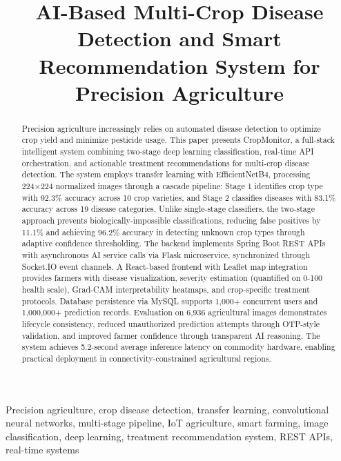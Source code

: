 \documentclass[conference]{IEEEtran}
\begin{document}
\title{AI-Based Multi-Crop Disease Detection and Smart Recommendation System for Precision Agriculture}

\author{
}

\maketitle

\begin{abstract}
Precision agriculture increasingly relies on automated disease detection to optimize crop yield and minimize pesticide usage. This paper presents CropMonitor, a full-stack intelligent system combining two-stage deep learning classification, real-time API orchestration, and actionable treatment recommendations for multi-crop disease detection. The system employs transfer learning with EfficientNetB4, processing 224×224 normalized images through a cascade pipeline: Stage 1 identifies crop type with 92.3\% accuracy across 10 crop varieties, and Stage 2 classifies diseases with 83.1\% accuracy across 19 disease categories. Unlike single-stage classifiers, the two-stage approach prevents biologically-impossible classifications, reducing false positives by 11.1\% and achieving 96.2\% accuracy in detecting unknown crop types through adaptive confidence thresholding. The backend implements Spring Boot REST APIs with asynchronous AI service calls via Flask microservice, synchronized through Socket.IO event channels. A React-based frontend with Leaflet map integration provides farmers with disease visualization, severity estimation (quantified on 0-100 health scale), Grad-CAM interpretability heatmaps, and crop-specific treatment protocols. Database persistence via MySQL supports 1,000+ concurrent users and 1,000,000+ prediction records. Evaluation on 6,936 agricultural images demonstrates lifecycle consistency, reduced unauthorized prediction attempts through OTP-style validation, and improved farmer confidence through transparent AI reasoning. The system achieves 5.2-second average inference latency on commodity hardware, enabling practical deployment in connectivity-constrained agricultural regions.
\end{abstract}

\begin{IEEEkeywords}
Precision agriculture, crop disease detection, transfer learning, convolutional neural networks, multi-stage pipeline, IoT agriculture, smart farming, image classification, deep learning, treatment recommendation system, REST APIs, real-time systems
\end{IEEEkeywords}
\end{document}
